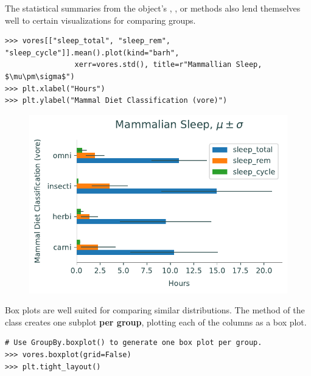 The statistical summaries from the  object's , , or  methods also lend themselves well to certain visualizations for comparing groups.

\begin{lstlisting}
>>> vores[["sleep_total", "sleep_rem", "sleep_cycle"]].mean().plot(kind="barh",
                xerr=vores.std(), title=r"Mammallian Sleep, $\mu\pm\sigma$")
>>> plt.xlabel("Hours")
>>> plt.ylabel("Mammal Diet Classification (vore)")
\end{lstlisting}

\begin{figure}[H]
    \centering
    \includegraphics[width=.7\textwidth]{figures/mammal_bar.pdf}
\end{figure}

Box plots are well suited for comparing similar distributions.
The  method of the  class creates one subplot \textbf{per group}, plotting each of the columns as a box plot.

\begin{lstlisting}
# Use GroupBy.boxplot() to generate one box plot per group.
>>> vores.boxplot(grid=False)
>>> plt.tight_layout()
\end{lstlisting}

